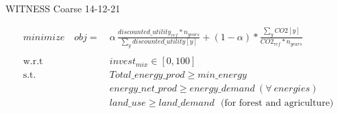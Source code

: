 \documentclass{article}
\begin{document}
WITNESS Coarse 14-12-21

\begin{equation}
\begin{aligned}
minimize \quad  obj =~
&\alpha\,\frac{discounted\_utility_{ref}*n_{years}}{\sum_{y}discounted\_utility[y]}+(1-\alpha)*\frac{\sum_{y}CO2[y]}{CO2_{ref}*n_{years}} \\
%
%
\\
\textrm{w.r.t} \quad & invest_{mix} \in [0,100]\\                     
\textrm{s.t.} \quad 
  & Total\_energy\_prod \geq min\_energy \\
  & energy\_net\_prod \geq energy\_demand ~(\forall~ energies) \\
  & land\_use \geq land\_demand \textrm{~~(for forest and agriculture)}
\end{aligned}
\end{equation}
\end{document}

